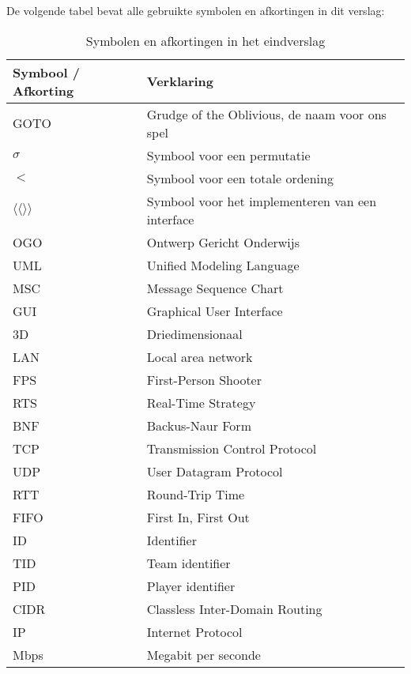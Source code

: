     De volgende tabel bevat alle gebruikte symbolen en afkortingen in dit verslag:
    \begin{table}[H]
        \small
        \centering
        \begin{tabular}{| l | l |}
        \hline
        Symbool / Afkorting & Verklaring \\ \hline
        GOTO & Grudge of the Oblivious, de naam voor ons spel \\ \hline
        $\sigma$ & Symbool voor een permutatie \\ \hline
        $<$ & Symbool voor een totale ordening \\ \hline
        $\langle\langle \rangle\rangle$ & Symbool voor het implementeren van een interface \\ \hline
        OGO & Ontwerp Gericht Onderwijs \\ \hline
        UML & Unified Modeling Language \\ \hline
        MSC & Message Sequence Chart \\ \hline
        GUI & Graphical User Interface \\ \hline
        3D & Driedimensionaal \\ \hline
        LAN & Local area network \\ \hline
        FPS & First-Person Shooter \\ \hline
        RTS & Real-Time Strategy \\ \hline
        BNF & Backus-Naur Form \\ \hline
        TCP & Transmission Control Protocol \\ \hline
        UDP & User Datagram Protocol \\ \hline
        RTT & Round-Trip Time \\ \hline
        FIFO & First In, First Out \\ \hline
        ID & Identifier \\ \hline
        TID & Team identifier \\ \hline
        PID & Player identifier \\ \hline
        CIDR & Classless Inter-Domain Routing \\ \hline
        IP & Internet Protocol \\ \hline
        Mbps & Megabit per seconde \\ \hline
        \end{tabular}
        \caption{Symbolen en afkortingen in het eindverslag}
        \label{tab:planning}
    \end{table} 